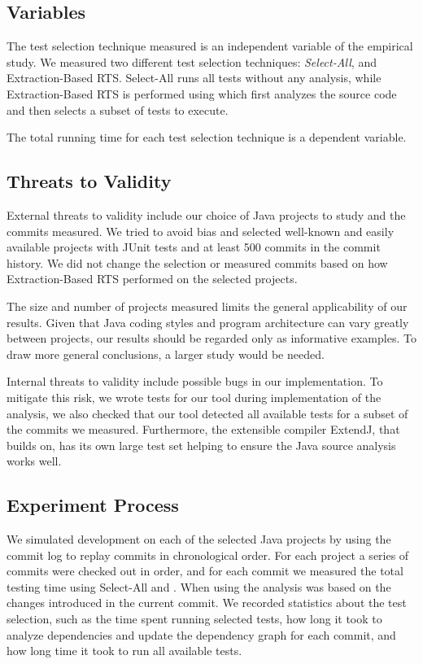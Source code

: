 {\subsection{Variables}

The test selection technique measured is an independent variable of the empirical study. We measured
two different test selection techniques: \emph{Select-All}, and Extraction-Based RTS.  Select-All
runs all tests without any analysis, while Extraction-Based RTS is performed using \ourtool{} which
first analyzes the source code and then selects a subset of tests to execute.

The total running time for each test selection technique is a dependent variable.

\subsection{Threats to Validity}

External threats to validity include our choice of Java projects to study and the commits measured.
We tried to avoid bias and selected well-known and easily available projects with JUnit tests and at
least 500 commits in the commit history.  We did not change the selection or measured commits based
on how Extraction-Based RTS performed on the selected projects.

The size and number of projects measured limits the general applicability of our results.
Given that Java coding styles and program architecture can vary greatly between projects, our
results should be regarded only as informative examples. To draw more general conclusions, a larger
study would be needed.

Internal threats to validity include possible bugs in our implementation. To mitigate this risk, we
wrote tests for our tool during implementation of the analysis, we also checked that our tool
detected all available tests for a subset of the commits we measured.  Furthermore, the extensible
compiler ExtendJ, that \ourtool{} builds on, has its own large test set helping to ensure the
Java source analysis works well.
  
\subsection{Experiment Process}

We simulated development on each of the selected Java projects by using the commit log to replay
commits in chronological order. For each project a series of commits were checked out in order, and
for each commit we measured the total testing time using Select-All and \ourtool{}.  When using
\ourtool{} the analysis was based on the changes introduced in the current commit.  We recorded
statistics about the test selection, such as the time spent running selected tests, how long it took
to analyze dependencies and update the dependency graph for each commit, and how long time it took
to run all available tests.

}
